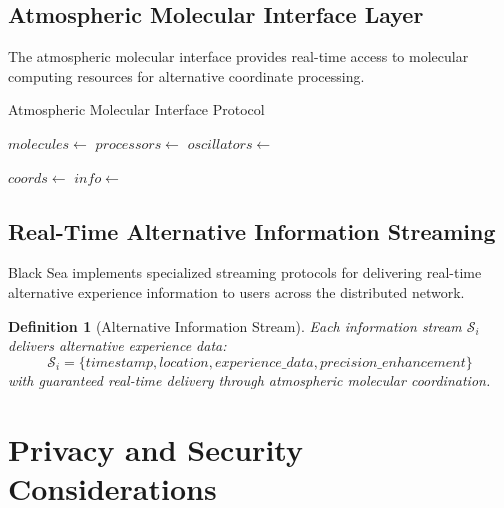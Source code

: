 \documentclass[12pt,a4paper]{article}
\newtheorem{definition}{Definition}
\begin{document}
\subsection{Atmospheric Molecular Interface Layer}

The atmospheric molecular interface provides real-time access to molecular computing resources for alternative coordinate processing.

\begin{algorithm}
\caption{Atmospheric Molecular Interface Protocol}
\begin{algorithmic}[1]
    \State $molecules \gets$ 
    \State $processors \gets$ 
    \State $oscillators \gets$ 
    
        \State $coords \gets$ 
        \State $info \gets$ 
        \State {}
    \EndFor
\EndProcedure
\end{algorithmic}
\end{algorithm}

\subsection{Real-Time Alternative Information Streaming}

Black Sea implements specialized streaming protocols for delivering real-time alternative experience information to users across the distributed network.

\begin{definition}[Alternative Information Stream]
Each information stream $\mathcal{S}_i$ delivers alternative experience data:
\begin{equation}
\mathcal{S}_i = \{timestamp, location, experience\_data, precision\_enhancement\}
\end{equation}
with guaranteed real-time delivery through atmospheric molecular coordination.
\end{definition}

\section{Privacy and Security Considerations}
\end{document}
